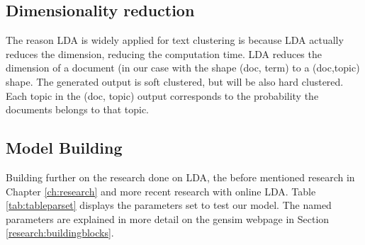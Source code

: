 \subsection{Dimensionality reduction} \label{methodology:dimreduction}
The reason LDA is widely applied for text clustering is because LDA actually reduces the dimension, reducing the computation time. LDA reduces the dimension of a document (in our case with the shape (doc, term) to a (doc,topic) shape. The generated output is soft clustered, but will be also hard clustered. Each topic in the (doc, topic) output corresponds to the probability the documents belongs to that topic.

\subsection{Model Building} \label{methodology:model_building}
Building further on the research done on LDA, the before mentioned research in Chapter \ref{ch:research} and more recent research with online LDA. Table \ref{tab:tableparset} displays the parameters set to test our model. The named parameters are explained in more detail on the gensim webpage in Section \ref{research:buildingblocks}. 

